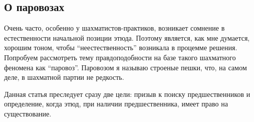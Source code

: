 \subsection*{О паровозах}
\markright{}

Очень часто, особенно у шахматистов-практиков, возникает сомнение в естественности начальной позиции этюда. Поэтому является, как мне думается, хорошим тоном, чтобы ``неестественность'' возникала в процемме решения. Попробуем рассмотреть тему правдоподобности на базе такого шахматного феномена как ``паровоз''. Паровозом я называю строеные пешки, что, на самом деле, в шахматной партии не редкость.

Данная статья преследует сразу две цели: призыв к поиску предшественников и определение, когда этюд, при наличии предшественника, имеет право на существование.

